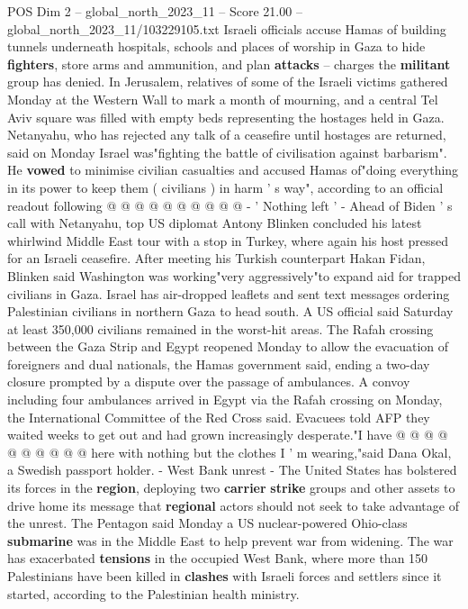 \begin{textsample}{POS Dim 2 – global\_north\_2023\_11 – Score 21.00 – global\_north\_2023\_11/103229105.txt}
Israeli officials accuse Hamas of building tunnels underneath hospitals, schools and places of worship in Gaza to hide \textbf{fighters}, store arms and ammunition, and plan \textbf{attacks} -- charges the \textbf{militant} group has denied.
In Jerusalem, relatives of some of the Israeli victims gathered Monday at the Western Wall to mark a month of mourning, and a central Tel Aviv square was filled with empty beds representing the hostages held in Gaza.
Netanyahu, who has rejected any talk of a ceasefire until hostages are returned, said on Monday Israel was"fighting the battle of civilisation against barbarism".
He \textbf{vowed} to minimise civilian casualties and accused Hamas of"doing everything in its power to keep them ( civilians ) in harm ' s way", according to an official readout following @ @ @ @ @ @ @ @ @ @ - ' Nothing left ' - Ahead of Biden ' s call with Netanyahu, top US diplomat Antony Blinken concluded his latest whirlwind Middle East tour with a stop in Turkey, where again his host pressed for an Israeli ceasefire.
After meeting his Turkish counterpart Hakan Fidan, Blinken said Washington was working"very aggressively"to expand aid for trapped civilians in Gaza.
Israel has air-dropped leaflets and sent text messages ordering Palestinian civilians in northern Gaza to head south.
A US official said Saturday at least 350,000 civilians remained in the worst-hit areas.
The Rafah crossing between the Gaza Strip and Egypt reopened Monday to allow the evacuation of foreigners and dual nationals, the Hamas government said, ending a two-day closure prompted by a dispute over the passage of ambulances.
A convoy including four ambulances arrived in Egypt via the Rafah crossing on Monday, the International Committee of the Red Cross said.
Evacuees told AFP they waited weeks to get out and had grown increasingly desperate."I have @ @ @ @ @ @ @ @ @ @ here with nothing but the clothes I ' m wearing,"said Dana Okal, a Swedish passport holder. - West Bank unrest - The United States has bolstered its forces in the \textbf{region}, deploying two \textbf{carrier} \textbf{strike} groups and other assets to drive home its message that \textbf{regional} actors should not seek to take advantage of the unrest.
The Pentagon said Monday a US nuclear-powered Ohio-class \textbf{submarine} was in the Middle East to help prevent war from widening.
The war has exacerbated \textbf{tensions} in the occupied West Bank, where more than 150 Palestinians have been killed in \textbf{clashes} with Israeli forces and settlers since it started, according to the Palestinian health ministry.

\end{textsample}
